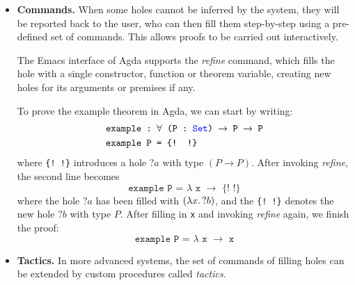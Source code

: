 \documentclass[twoside]{report}
\begin{document}
\begin{itemize}
    \item \textbf{Commands.} When some holes cannot be inferred by the system, they will be reported back to the user, who can then fill them step-by-step using a pre-defined set of commands. This allows proofs to be carried out interactively.

          \begin{example}
              The Emacs interface of Agda \cite{coquand2006emacs} supports the \emph{refine} command, which fills the hole with a single constructor, function or theorem variable, creating new holes for its arguments or premises if any.

              To prove the example theorem in Agda, we can start by writing:
              $$
                  \begin{aligned}
                  &\texttt{example :\ $\forall$ (P :\ \textcolor{blue}{Set}) $\rightarrow$ P $\rightarrow$ P} \\
                  &\texttt{example P = \{! !\}}
                  \end{aligned}
              $$
              where \texttt{\{! !\}} introduces a hole ${?a}$ with type $(P \rightarrow P)$. After invoking \emph{refine}, the second line becomes
              $$\texttt{example P = $\lambda$ x $\rightarrow$ \{! !\}}$$
              where the hole ${?a}$ has been filled with $(\lambda{x}.\,{?b})$, and the \texttt{\{! !\}} denotes the new hole ${?b}$ with type $P$. After filling in \texttt{x} and invoking \emph{refine} again, we finish the proof:
              $$\texttt{example P = $\lambda$ x $\rightarrow$ x}$$
          \end{example}

    \item \textbf{Tactics.} In more advanced systems, the set of commands of filling holes can be extended by custom procedures called \emph{tactics}.


\end{itemize}
\end{document}
